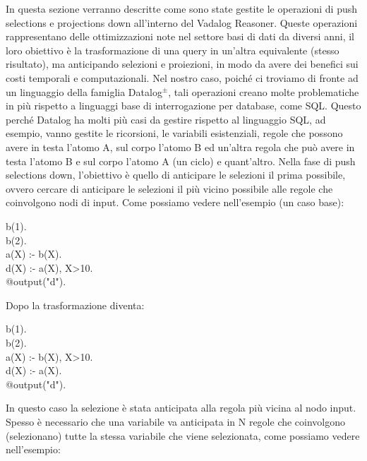 In questa sezione verranno descritte come sono state gestite le operazioni di push selections e projections down all'interno del Vadalog Reasoner. \newline
Queste operazioni rappresentano delle ottimizzazioni note nel settore basi di dati da diversi anni, il loro obiettivo è la trasformazione di una query in un'altra equivalente (stesso risultato), ma anticipando selezioni e proiezioni, in modo da avere dei benefici sui costi temporali e computazionali. \newline
Nel nostro caso, poiché ci troviamo di fronte ad un linguaggio della famiglia Datalog$^\pm$, tali operazioni creano molte problematiche in più rispetto a linguaggi base di interrogazione per database, come SQL. \newline
Questo perché Datalog ha molti più casi da gestire rispetto al linguaggio SQL, ad esempio, vanno gestite le ricorsioni, le variabili esistenziali, regole che possono avere in testa l'atomo A, sul corpo l'atomo B ed un'altra regola che può avere in testa l'atomo B e sul corpo l'atomo A (un ciclo) e quant'altro. \newline \newline
Nella fase di push selections down, l'obiettivo è quello di anticipare le selezioni il prima possibile, ovvero cercare di anticipare le selezioni il più vicino possibile alle regole che coinvolgono nodi di input. Come possiamo vedere nell'esempio (un caso base): 
\begin{algorithm}[h]
	b(1). \\
	b(2). \\
	a(X) :- b(X). \\
	d(X) :- a(X), X>10. \\
	@output("d").
\end{algorithm} 

Dopo la trasformazione diventa: 

\begin{algorithm}[h]
	b(1). \\
	b(2). \\
	a(X) :- b(X), X>10. \\
	d(X) :- a(X). \\
	@output("d"). 
\end{algorithm}

In questo caso la selezione è stata anticipata alla regola più vicina al nodo input. \newline
Spesso è necessario che una variabile va anticipata in N regole che coinvolgono (selezionano) tutte la stessa variabile che viene selezionata, come possiamo vedere nell'esempio: 

